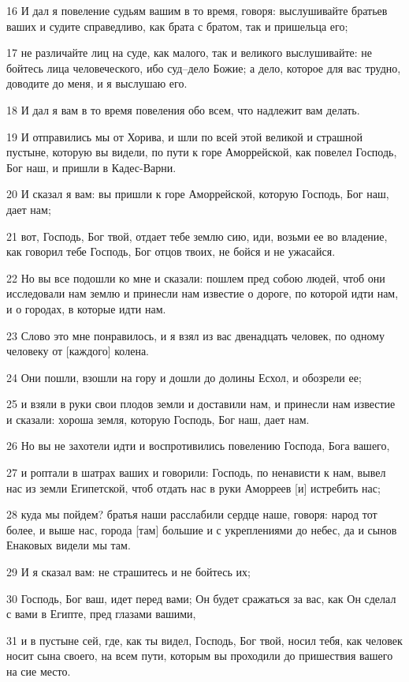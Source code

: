 \par 16 И дал я повеление судьям вашим в то время, говоря: выслушивайте братьев ваших и судите справедливо, как брата с братом, так и пришельца его;
\par 17 не различайте лиц на суде, как малого, так и великого выслушивайте: не бойтесь лица человеческого, ибо суд--дело Божие; а дело, которое для вас трудно, доводите до меня, и я выслушаю его.
\par 18 И дал я вам в то время повеления обо всем, что надлежит вам делать.
\par 19 И отправились мы от Хорива, и шли по всей этой великой и страшной пустыне, которую вы видели, по пути к горе Аморрейской, как повелел Господь, Бог наш, и пришли в Кадес-Варни.
\par 20 И сказал я вам: вы пришли к горе Аморрейской, которую Господь, Бог наш, дает нам;
\par 21 вот, Господь, Бог твой, отдает тебе землю сию, иди, возьми ее во владение, как говорил тебе Господь, Бог отцов твоих, не бойся и не ужасайся.
\par 22 Но вы все подошли ко мне и сказали: пошлем пред собою людей, чтоб они исследовали нам землю и принесли нам известие о дороге, по которой идти нам, и о городах, в которые идти нам.
\par 23 Слово это мне понравилось, и я взял из вас двенадцать человек, по одному человеку от [каждого] колена.
\par 24 Они пошли, взошли на гору и дошли до долины Есхол, и обозрели ее;
\par 25 и взяли в руки свои плодов земли и доставили нам, и принесли нам известие и сказали: хороша земля, которую Господь, Бог наш, дает нам.
\par 26 Но вы не захотели идти и воспротивились повелению Господа, Бога вашего,
\par 27 и роптали в шатрах ваших и говорили: Господь, по ненависти к нам, вывел нас из земли Египетской, чтоб отдать нас в руки Аморреев [и] истребить нас;
\par 28 куда мы пойдем? братья наши расслабили сердце наше, говоря: народ тот более, и выше нас, города [там] большие и с укреплениями до небес, да и сынов Енаковых видели мы там.
\par 29 И я сказал вам: не страшитесь и не бойтесь их;
\par 30 Господь, Бог ваш, идет перед вами; Он будет сражаться за вас, как Он сделал с вами в Египте, пред глазами вашими,
\par 31 и в пустыне сей, где, как ты видел, Господь, Бог твой, носил тебя, как человек носит сына своего, на всем пути, которым вы проходили до пришествия вашего на сие место.
